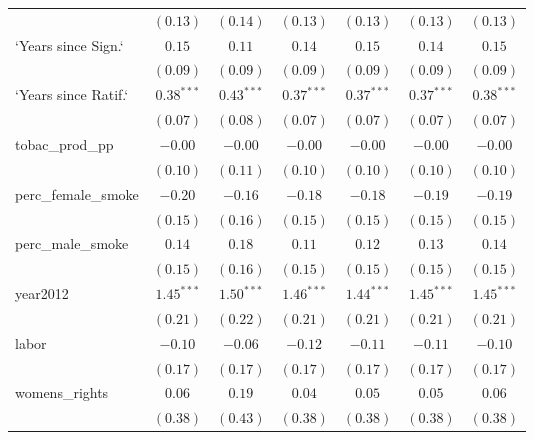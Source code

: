\begin{table}[!h]
\begin{center}
\begin{tabular}{l c c c c c c }
                        & $(0.13)$     & $(0.14)$     & $(0.13)$     & $(0.13)$     & $(0.13)$     & $(0.13)$     \\
`Years since Sign.`     & $0.15$       & $0.11$       & $0.14$       & $0.15$       & $0.14$       & $0.15$       \\
                        & $(0.09)$     & $(0.09)$     & $(0.09)$     & $(0.09)$     & $(0.09)$     & $(0.09)$     \\
`Years since Ratif.`    & $0.38^{***}$ & $0.43^{***}$ & $0.37^{***}$ & $0.37^{***}$ & $0.37^{***}$ & $0.38^{***}$ \\
                        & $(0.07)$     & $(0.08)$     & $(0.07)$     & $(0.07)$     & $(0.07)$     & $(0.07)$     \\
tobac\_prod\_pp         & $-0.00$      & $-0.00$      & $-0.00$      & $-0.00$      & $-0.00$      & $-0.00$      \\
                        & $(0.10)$     & $(0.11)$     & $(0.10)$     & $(0.10)$     & $(0.10)$     & $(0.10)$     \\
perc\_female\_smoke     & $-0.20$      & $-0.16$      & $-0.18$      & $-0.18$      & $-0.19$      & $-0.19$      \\
                        & $(0.15)$     & $(0.16)$     & $(0.15)$     & $(0.15)$     & $(0.15)$     & $(0.15)$     \\
perc\_male\_smoke       & $0.14$       & $0.18$       & $0.11$       & $0.12$       & $0.13$       & $0.14$       \\
                        & $(0.15)$     & $(0.16)$     & $(0.15)$     & $(0.15)$     & $(0.15)$     & $(0.15)$     \\
year2012                & $1.45^{***}$ & $1.50^{***}$ & $1.46^{***}$ & $1.44^{***}$ & $1.45^{***}$ & $1.45^{***}$ \\
                        & $(0.21)$     & $(0.22)$     & $(0.21)$     & $(0.21)$     & $(0.21)$     & $(0.21)$     \\
labor                   & $-0.10$      & $-0.06$      & $-0.12$      & $-0.11$      & $-0.11$      & $-0.10$      \\
                        & $(0.17)$     & $(0.17)$     & $(0.17)$     & $(0.17)$     & $(0.17)$     & $(0.17)$     \\
womens\_rights          & $0.06$       & $0.19$       & $0.04$       & $0.05$       & $0.05$       & $0.06$       \\
                        & $(0.38)$     & $(0.43)$     & $(0.38)$     & $(0.38)$     & $(0.38)$     & $(0.38)$     \\

\end{tabular}
\end{center}
\end{table}
